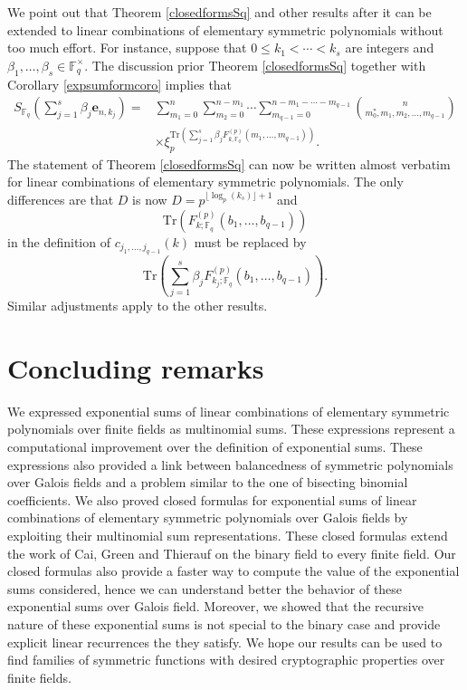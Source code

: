 We point out that Theorem \ref{closedformsSq} and other results after it can be extended to linear combinations of elementary symmetric polynomials without too much effort. For instance, 
suppose that $0\leq k_1<\cdots<k_s$ are integers and 
$\beta_1,\ldots,\beta_s \in \mathbb{F}_q^{\times}$. The discussion prior Theorem \ref{closedformsSq} together with Corollary \ref{expsumformcoro} implies that
\begin{align}
\label{goodtype3}
S_{\mathbb{F}_q}\left(\sum_{j=1}^s \beta_j\boldsymbol{e}_{n,k_j}\right) =& \sum_{m_1=0}^n\sum_{m_2=0}^{n-m_1}\cdots\sum_{m_{q-1}=0}^{n-m_1-\cdots-m_{q-1}}{n\choose m_0^*,m_1,m_2,\ldots, m_{q-1}}\\\nonumber
& \times \xi_p^{\text{Tr}\left(\sum_{j=1}^s \beta_j F^{(p)}_{k,\mathbb{F}_q}\left(m_1,\ldots,m_{q-1}\right)\right)}.
\end{align}
The statement of Theorem \ref{closedformsSq} can now be written almost verbatim for linear combinations of elementary symmetric polynomials.
The only differences are that $D$ is now $D=p^{\lfloor\log_p(k_s)\rfloor+1}$
and $$\text{Tr}\left(F_{k;\mathbb{F}_q}^{(p)}\left(b_1,\ldots,b_{q-1}\right)\right)$$ in the definition of $c_{j_1,\ldots,j_{q-1}}(k)$ must be replaced by
$$\text{Tr}\left(\sum_{j=1}^s \beta_j F_{k_j;\mathbb{F}_q}^{(p)}\left(b_1,\ldots,b_{q-1}\right)\right).$$
Similar adjustments apply to the other results.

\section{Concluding remarks}
We expressed exponential sums of linear combinations of elementary symmetric polynomials over finite fields as multinomial sums.  
These expressions represent a computational improvement over the definition of exponential sums.  These expressions also provided a link between balancedness of symmetric polynomials over Galois fields and 
a problem similar to the one of bisecting binomial coefficients.  We also proved closed formulas for exponential sums of linear combinations of elementary symmetric polynomials over Galois fields by 
exploiting their multinomial sum representations.  These closed formulas extend the work of Cai, Green and Thierauf on the 
binary field to every finite field.  Our closed formulas also provide a faster way to compute the value of the exponential sums considered, hence we can understand better the behavior of these exponential 
sums over Galois field. Moreover, we showed that the recursive nature of these exponential sums is not special to the binary case and provide explicit linear recurrences the they satisfy.  
We hope our results can be used to find families of symmetric functions with desired cryptographic properties over finite fields.\medskip


